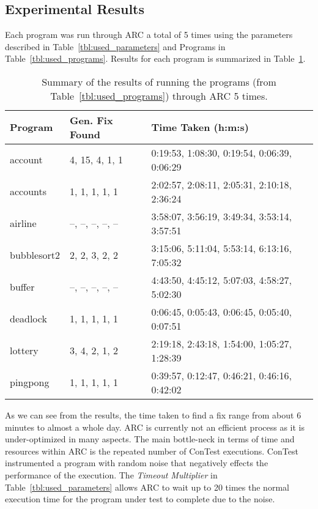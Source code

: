 \subsection{Experimental Results}
\label{sec:experimental_results}

Each program was run through ARC a total of 5 times using the parameters
described in Table~\ref{tbl:used_parameters} and Programs in
Table~\ref{tbl:used_programs}. Results for each program is summarized in
Table~\ref{tbl:summary_results}.

\begin{table}%
\caption{Summary of the results of running the programs
(from Table~\ref{tbl:used_programs}) through ARC 5 times.}
\begin{center}
\lstset{basicstyle=\scriptsize}
\begin{tabular}{|l|l|l|}
\hline
\textbf{Program} & \textbf{Gen. Fix Found} & \textbf{Time Taken (h:m:s)}\\
\hline
account & 4, 15, 4, 1, 1 & 0:19:53, 1:08:30, 0:19:54, 0:06:39, 0:06:29\\
\hline
accounts & 1, 1, 1, 1, 1 & 2:02:57, 2:08:11, 2:05:31, 2:10:18, 2:36:24\\
\hline
airline & --, --, --, --, -- & 3:58:07, 3:56:19, 3:49:34, 3:53:14, 3:57:51\\
\hline
bubblesort2 & 2, 2, 3, 2, 2 & 3:15:06, 5:11:04, 5:53:14, 6:13:16, 7:05:32 \\
\hline
buffer & --, --, --, --, -- & 4:43:50, 4:45:12, 5:07:03, 4:58:27, 5:02:30\\
\hline
deadlock & 1, 1, 1, 1, 1 & 0:06:45, 0:05:43, 0:06:45, 0:05:40, 0:07:51\\
\hline
lottery & 3, 4, 2, 1, 2 & 2:19:18, 2:43:18, 1:54:00, 1:05:27, 1:28:39\\
\hline
pingpong & 1, 1, 1, 1, 1 & 0:39:57, 0:12:47, 0:46:21, 0:46:16, 0:42:02\\
\hline
\end{tabular}
\label{tbl:summary_results}
\end{center}
\end{table}

As we can see from the results, the time taken to find a fix range from
about 6 minutes to almost a whole day. ARC is currently not an efficient process
as it is under-optimized in many aspects. The main bottle-neck in terms of time
and resources within ARC is the repeated number of ConTest executions. ConTest
instrumented a program with random noise that negatively effects the performance 
of the execution.  The \textit{Timeout Multiplier} in Table~\ref{tbl:used_parameters} allows ARC to wait up to 20 times the normal execution time for the program under test to complete due to the noise. 

